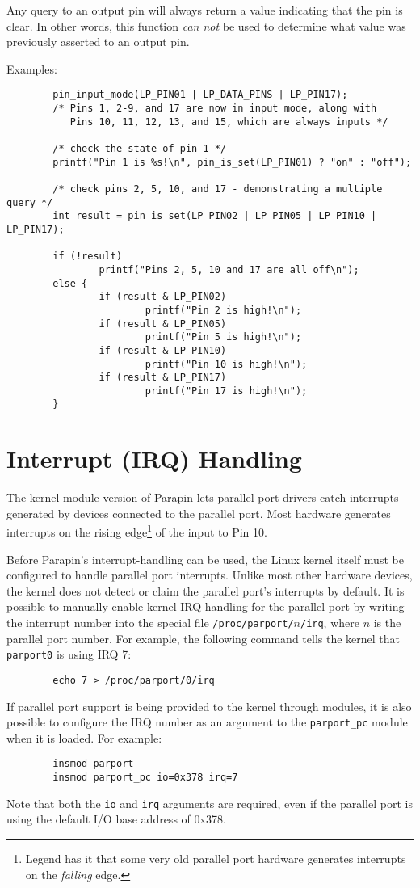 \documentclass{article}
\begin{document}
Any query to an output pin will always return a value indicating that
the pin is clear.  In other words, this function {\em can not} be used
to determine what value was previously asserted to an output pin.

Examples:
\begin{verbatim}
        pin_input_mode(LP_PIN01 | LP_DATA_PINS | LP_PIN17);
        /* Pins 1, 2-9, and 17 are now in input mode, along with
           Pins 10, 11, 12, 13, and 15, which are always inputs */

        /* check the state of pin 1 */
        printf("Pin 1 is %s!\n", pin_is_set(LP_PIN01) ? "on" : "off");

        /* check pins 2, 5, 10, and 17 - demonstrating a multiple query */
        int result = pin_is_set(LP_PIN02 | LP_PIN05 | LP_PIN10 | LP_PIN17);

        if (!result)
                printf("Pins 2, 5, 10 and 17 are all off\n");
        else {
                if (result & LP_PIN02)
                        printf("Pin 2 is high!\n");
                if (result & LP_PIN05)
                        printf("Pin 5 is high!\n");
                if (result & LP_PIN10)
                        printf("Pin 10 is high!\n");
                if (result & LP_PIN17)
                        printf("Pin 17 is high!\n");
        }
\end{verbatim}

\section{Interrupt (IRQ) Handling}
\label{interrupts}

The kernel-module version of Parapin lets parallel port drivers catch
interrupts generated by devices connected to the parallel port.  Most
hardware generates interrupts on the rising edge\footnote{Legend has
it that some very old parallel port hardware generates interrupts on
the {\em falling} edge.} of the input to Pin 10.

Before Parapin's interrupt-handling can be used, the Linux kernel
itself must be configured to handle parallel port interrupts.  Unlike
most other hardware devices, the kernel does not detect or claim the
parallel port's interrupts by default.  It is possible to manually
enable kernel IRQ handling for the parallel port by writing the
interrupt number into the special file {\tt /proc/parport/$n$/irq},
where $n$ is the parallel port number.  For example, the following
command tells the kernel that {\tt parport0} is using IRQ 7:
\begin{verbatim}
        echo 7 > /proc/parport/0/irq
\end{verbatim}
If parallel port support is being provided to the kernel through
modules, it is also possible to configure the IRQ number as an
argument to the {\tt parport\_pc} module when it is loaded.  For
example:
\begin{verbatim}
        insmod parport
        insmod parport_pc io=0x378 irq=7
\end{verbatim}
Note that both the {\tt io} and {\tt irq} arguments are required, even
if the parallel port is using the default I/O base address of 0x378.
\end{document}
